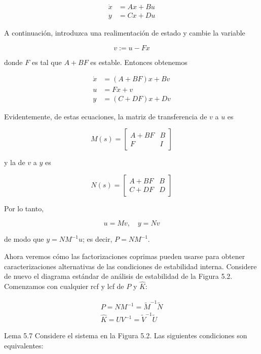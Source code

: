 $$
\begin{aligned}
\dot{x} & =A x+B u \\
y & =C x+D u
\end{aligned}
$$

A continuación, introduzca una realimentación de estado y cambie la variable

$$
v:=u-F x
$$

donde $F$ es tal que $A+B F$ es estable. Entonces obtenemos

$$
\begin{aligned}
\dot{x} & =(A+B F) x+B v \\
u & =F x+v \\
y & =(C+D F) x+D v
\end{aligned}
$$

Evidentemente, de estas ecuaciones, la matriz de transferencia de $v$ a $u$ es

$$
M(s)=\left[\begin{array}{c|c}
A+B F & B \\
\hline F & I
\end{array}\right]
$$

y la de $v$ a $y$ es

$$
N(s)=\left[\begin{array}{c|c}
A+B F & B \\
\hline C+D F & D
\end{array}\right]
$$

Por lo tanto,

$$
u=M v, \quad y=N v
$$

de modo que $y=N M^{-1} u$; es decir, $P=N M^{-1}$.

Ahora veremos cómo las factorizaciones coprimas pueden usarse para obtener caracterizaciones alternativas de las condiciones de estabilidad interna. Considere de nuevo el diagrama estándar de análisis de estabilidad de la Figura 5.2. Comenzamos con cualquier rcf y lcf de $P$ y $\hat{K}$:


\begin{gather*}
P=N M^{-1}=\tilde{M}^{-1} \tilde{N}  \tag{5.10}\\
\hat{K}=U V^{-1}=\tilde{V}^{-1} \tilde{U} \tag{5.11}
\end{gather*}


Lema 5.7 Considere el sistema en la Figura 5.2. Las siguientes condiciones son equivalentes:

